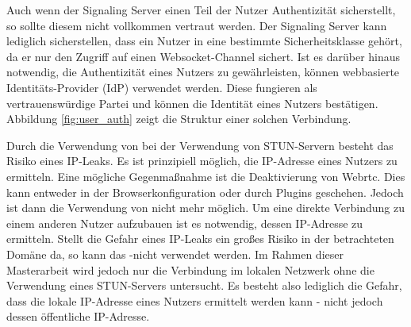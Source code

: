 Auch wenn der Signaling Server einen Teil der Nutzer Authentizität sicherstellt, so sollte diesem nicht vollkommen vertraut werden. Der Signaling Server kann lediglich sicherstellen, dass ein Nutzer in eine bestimmte Sicherheitsklasse gehört, da er nur den Zugriff auf einen Websocket-Channel sichert. Ist es darüber hinaus notwendig, die Authentizität eines Nutzers zu gewährleisten, können webbasierte Identitäts-Provider (IdP) verwendet werden. Diese fungieren als vertrauenswürdige Partei und können die Identität eines Nutzers bestätigen. Abbildung \ref{fig:user_auth} zeigt die Struktur einer solchen Verbindung.

Durch die Verwendung von \webrtc bei der Verwendung von STUN-Servern besteht das Risiko eines IP-Leaks.\cite{rtcweb-security} Es ist prinzipiell möglich, die IP-Adresse eines Nutzers zu ermitteln. Eine mögliche Gegenmaßnahme ist die Deaktivierung von Webrtc. Dies kann entweder in der Browserkonfiguration oder durch Plugins geschehen. Jedoch ist dann die Verwendung von \webrtc nicht mehr möglich. Um eine direkte Verbindung zu einem anderen Nutzer aufzubauen ist es notwendig, dessen IP-Adresse zu ermitteln. Stellt die Gefahr eines IP-Leaks ein großes Risiko in der betrachteten Domäne da, so kann das \pTp-\cdn nicht verwendet werden. Im Rahmen dieser Masterarbeit wird jedoch nur die Verbindung im lokalen Netzwerk ohne die Verwendung eines STUN-Servers untersucht. Es besteht also lediglich die Gefahr, dass die lokale IP-Adresse eines Nutzers ermittelt werden kann - nicht jedoch dessen öffentliche IP-Adresse.


